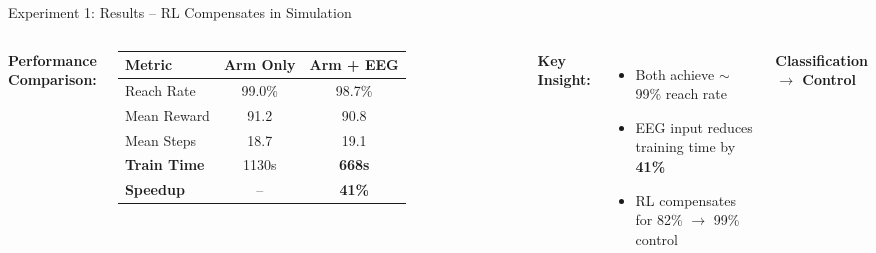 \documentclass[aspectratio=169, 11pt]{beamer}
\begin{document}
\begin{frame}{Experiment 1: Results -- RL Compensates in Simulation}
    \begin{columns}[T]
        \textbf{Performance Comparison:}
        
        \vspace{2mm}
        \begin{table}
            \centering
            \small
            \begin{tabular}{lcc}
                \toprule
                Metric & Arm Only & Arm + EEG \\
                \midrule
                Reach Rate & 99.0\% & 98.7\% \\
                Mean Reward & 91.2 & 90.8 \\
                Mean Steps & 18.7 & 19.1 \\
                \textbf{Train Time} & 1130s & \textbf{668s} \\
                \midrule
                \textbf{Speedup} & -- & \textbf{41\%} \\
                \bottomrule
            \end{tabular}
        \end{table}
        
        \vspace{3mm}
        \textbf{Key Insight:}
        \begin{itemize}
            \item Both achieve $\sim$99\% reach rate
            \item EEG input reduces training time by \textbf{41\%}
            \item RL compensates for 82\% $\rightarrow$ 99\% control
        \end{itemize}
        
        \begin{center}
        \textbf{Classification $\rightarrow$ Control}
        
        \vspace{3mm}
\end{center}
\end{columns}
\end{frame}
\end{document}
